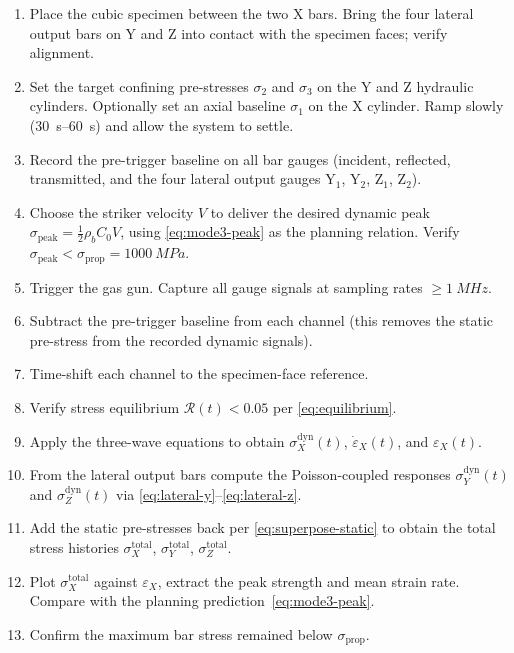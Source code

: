 \documentclass[11pt,a4paper,openany]{book}
\providecommand{\SI}[2]{\qty{#1}{#2}}
\providecommand{\SIrange}[3]{\qtyrange{#1}{#2}{#3}}
\theoremstyle{handbook}
\newcommand{\sig}{\sigma}
\newcommand{\eps}{\varepsilon}
\newcommand{\epsdot}{\dot\eps}
\newcommand{\Cz}{C_0}
\newcommand{\sigprop}{\sig_{\text{prop}}}
\newcommand{\sigpeak}{\sig_{\text{peak}}}
\begin{document}
\begin{stepbox}
\begin{enumerate}[leftmargin=*,itemsep=3pt]
  \item Place the cubic specimen between the two X bars. Bring the four
        lateral output bars on Y and Z into contact with the specimen
        faces; verify alignment.
  \item Set the target confining pre-stresses $\sig_2$ and $\sig_3$ on the
        Y and Z hydraulic cylinders. Optionally set an axial baseline
        $\sig_1$ on the X cylinder. Ramp slowly
        (\SIrange{30}{60}{s}) and allow the system to settle.
  \item Record the pre-trigger baseline on all bar gauges (incident,
        reflected, transmitted, and the four lateral output gauges
        Y$_1$, Y$_2$, Z$_1$, Z$_2$).
  \item Choose the striker velocity $V$ to deliver the desired dynamic
        peak $\sigpeak=\tfrac{1}{2}\rho_b\Cz V$, using \eqref{eq:mode3-peak}
        as the planning relation. Verify $\sigpeak<\sigprop=\SI{1000}{MPa}$.
  \item Trigger the gas gun. Capture all gauge signals at sampling rates
        $\ge\SI{1}{MHz}$.
  \item Subtract the pre-trigger baseline from each channel (this removes
        the static pre-stress from the recorded dynamic signals).
  \item Time-shift each channel to the specimen-face reference.
  \item Verify stress equilibrium $\mathcal{R}(t)<0.05$ per
        \eqref{eq:equilibrium}.
  \item Apply the three-wave equations to obtain $\sig_X^{\text{dyn}}(t)$,
        $\epsdot_X(t)$, and $\eps_X(t)$.
  \item From the lateral output bars compute the Poisson-coupled responses
        $\sig_Y^{\text{dyn}}(t)$ and $\sig_Z^{\text{dyn}}(t)$ via
        \eqref{eq:lateral-y}--\eqref{eq:lateral-z}.
  \item Add the static pre-stresses back per \eqref{eq:superpose-static} to
        obtain the total stress histories $\sig_X^{\text{total}}$,
        $\sig_Y^{\text{total}}$, $\sig_Z^{\text{total}}$.
  \item Plot $\sig_X^{\text{total}}$ against $\eps_X$, extract the peak
        strength and mean strain rate. Compare with the planning
        prediction~\eqref{eq:mode3-peak}.
  \item Confirm the maximum bar stress remained below $\sigprop$.
\end{enumerate}
\end{stepbox}
\end{document}
